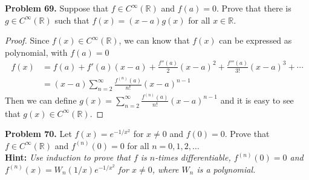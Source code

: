 \documentclass[12pt,leqno]{amsart}
\begin{document}
\medskip

\noindent
{\bf Problem 69.}
Suppose that $f\in C^\infty(\mathbb{R})$ and $f(a)=0$. Prove that there is $g\in C^\infty(\mathbb{R})$ such that $f(x)=(x-a)g(x)$ for all $x\in\mathbb{R}$.
\begin{proof}
Since $f(x)\in C^\infty(\mathbb{R})$, we can know that $f(x)$ can be expressed as polynomial, with $f(a) = 0$
\begin{align*}
    f(x) & = f(a) + f'(a)(x-a) + \frac{f''(a)}{2}(x-a)^2 + \frac{f'''(a)}{3!}(x-a)^3 + \cdots \\
    & = (x-a)\sum^\infty_{n=2}\frac{f^{(n)}(a)}{n!}(x-a)^{n-1}
\end{align*}
Then we can define $g(x) = \sum^\infty_{n=2}\frac{f^{(n)}(a)}{n!}(x-a)^{n-1}$ and it is easy to see that $g(x)\in C^\infty(\mathbb{R})$.
\end{proof}

\medskip

\noindent
{\bf Problem 70.}
Let $f(x)=e^{-1/x^2}$ for $x\neq 0$ and $f(0)=0$. Prove that $f\in C^\infty(\mathbb{R})$ and $f^{(n)}(0)=0$ for all $n=0,1,2,\ldots$\\
{\bf Hint:} {\em Use induction to prove that $f$ is $n$-times differentiable, $f^{(n)}(0)=0$ and $f^{(n)}(x)=W_n(1/x)e^{-1/x^2}$ for $x\neq 0$, where $W_n$ is a polynomial.}
\end{document}
